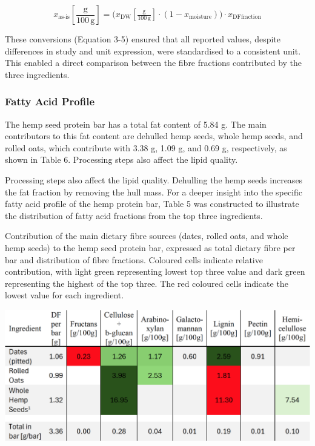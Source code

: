 \begin{equation}
    x_{\text{as-is}}\!\left[\frac{\mathrm{g}}{100\,\mathrm{g}}\right]
    = \bigl( x_{\mathrm{DW}}\!\left[\tfrac{\mathrm{g}}{100\,\mathrm{g}}\right]
    \cdot (1 - x_{\text{moisture}}) \bigr)
    \cdot x_{\text{DFfraction}}
    \label{eq:asis_dffraction}
\end{equation}

These conversions (Equation 3-5) ensured that all reported values, despite differences in study and unit expression, were standardised to a consistent unit. This enabled a direct comparison between the fibre fractions contributed by the three ingredients. 

\subsubsection{Fatty Acid Profile}
The hemp seed protein bar has a total fat content of 5.84 g. The main contributors to this fat content
are dehulled hemp seeds, whole hemp seeds, and rolled oats, which contribute with 3.38 g, 1.09 g,
and 0.69 g, respectively, as shown in Table 6. Processing steps also affect the lipid quality.

\vspace{1em}
Processing steps also affect the lipid quality. Dehulling the hemp seeds increases the fat fraction by removing the hull mass. For a deeper insight into the specific fatty acid profile of the hemp protein bar, Table 5 was constructed to illustrate the distribution of fatty acid fractions from the top three ingredients. 

\begin{table}[H]
    \centering
    \caption{Contribution of the main dietary fibre sources (dates, rolled oats, and whole hemp seeds) to the hemp seed protein bar,
    expressed as total dietary fibre per bar and distribution of fibre fractions. Coloured cells indicate relative contribution, with light
    green representing lowest top three value and dark green representing the highest of the top three. The red coloured cells indicate the
    lowest value for each ingredient.}
    \label{tab:df_tab_01}
    \includegraphics[width=\linewidth]{Figures/tab_df_01.png}
\end{table}

